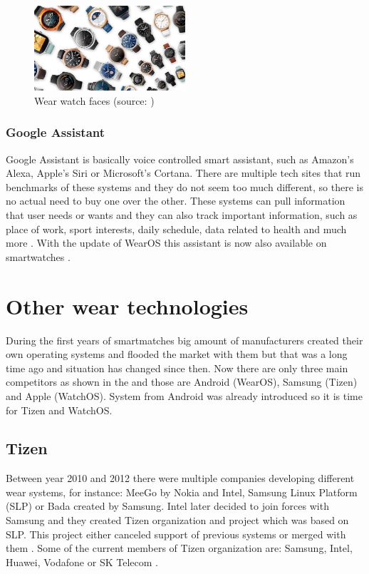 \begin{figure}[H]
	\begin{centering}
		\includegraphics[width=0.5\textwidth]{img/wear_watch_faces}
		\par\end{centering}
	\caption{Wear watch faces (source: \cite{AW2UG})\label{fig:WearWatchFaces}}
	\label{fig04c04}
\end{figure}

\subsubsection{Google Assistant}\label{sec:GoogleAssistant}
Google Assistant is basically voice controlled smart assistant, such as Amazon's Alexa, Apple's Siri or Microsoft's Cortana. There are multiple tech sites that run benchmarks of these systems \cite{ASGA, VACCGASAB, CAGACS, GASBAC} and they do not seem too much different, so there is no actual need to buy one over the other. These systems can pull information that user needs or wants and they can also track important information, such as place of work, sport interests, daily schedule, data related to health and much more \cite{WIGA}. With the update of WearOS this assistant is now also available on smartwatches \cite{AW2UG, AW2WN}.

\section{Other wear technologies}\label{sec:OtherWearTechnologies}
During the first years of smartmatches big amount of manufacturers created their own operating systems and flooded the market with them but that was a long time ago and situation has changed since then. Now there are only three main competitors as shown in the  and those are Android (WearOS), Samsung (Tizen) and Apple (WatchOS). System from Android was already introduced so it is time for Tizen and WatchOS.

\subsection{Tizen}\label{sec:Tizen}
Between year 2010 and 2012 there were multiple companies developing different wear systems, for instance: MeeGo by Nokia and Intel, Samsung Linux Platform (SLP) or Bada created by Samsung. Intel later decided to join forces with Samsung and they created Tizen organization and project which was based on SLP. This project either canceled support of previous systems or merged with them \cite{TOSBHR}. Some of the current members of Tizen organization are: Samsung, Intel, Huawei, Vodafone or SK Telecom \cite{TizenM}.


